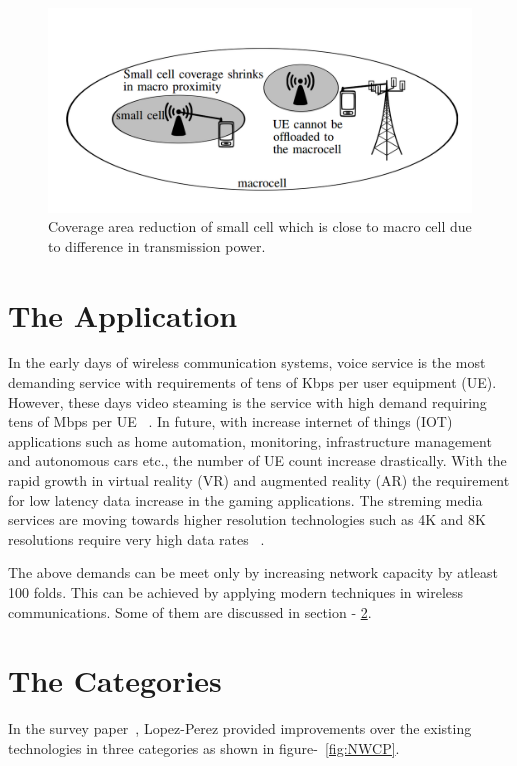 \documentclass[12pt,onecolumn]{IEEEtran}
\begin{document}
\begin{figure}[ht]
\includegraphics[scale=0.4]{sm_inter}
\centering
\caption{Coverage area reduction of small cell which is close to macro cell due to difference in transmission power.~\cite{main_paper}}
\label{fig:SMI}
\end{figure}

\section{The Application}
\label{sec:TA}

In the early days of wireless communication systems, voice service is the most demanding service with requirements of tens of Kbps per user equipment (UE). However, these days video steaming is the service with high demand requiring tens of Mbps per UE ~\cite{stream_vid}. 
In future, with increase internet of things (IOT) applications such as home automation, monitoring, infrastructure management and autonomous cars etc., the number of UE count increase drastically. 
With the rapid growth in virtual reality (VR) and augmented reality (AR) the requirement for low latency data increase in the gaming applications. 
The streming media services are moving towards higher resolution technologies such as 4K and 8K resolutions require very high data rates ~\cite{youtube}.

The above demands can be meet only by increasing network capacity by atleast 100 folds. This can be achieved by applying modern techniques in wireless communications. Some of them are discussed in section - \ref{sec:TC}.

\section{The Categories}  
\label{sec:TC}
In the survey paper~\cite{main_paper}, Lopez-Perez provided improvements over the existing technologies in three categories as shown in figure-~\ref{fig:NWCP}.
\end{document}
